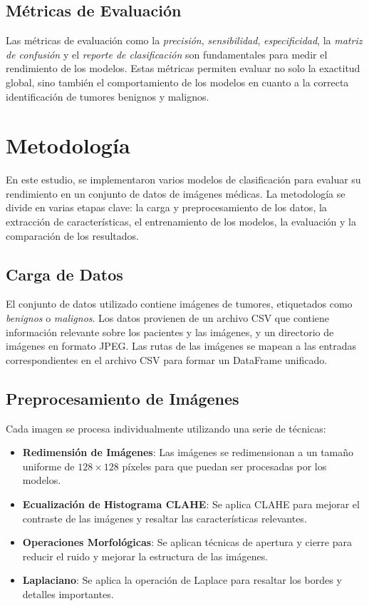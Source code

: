 \documentclass[12pt]{article}
\begin{document}
\subsection{Métricas de Evaluación}
Las métricas de evaluación como la \textit{precisión}, \textit{sensibilidad}, \textit{especificidad}, la \textit{matriz de confusión} y el \textit{reporte de clasificación} son fundamentales para medir el rendimiento de los modelos. Estas métricas permiten evaluar no solo la exactitud global, sino también el comportamiento de los modelos en cuanto a la correcta identificación de tumores benignos y malignos.

\section{Metodología}
En este estudio, se implementaron varios modelos de clasificación para evaluar su rendimiento en un conjunto de datos de imágenes médicas. La metodología se divide en varias etapas clave: la carga y preprocesamiento de los datos, la extracción de características, el entrenamiento de los modelos, la evaluación y la comparación de los resultados.

\subsection{Carga de Datos}
El conjunto de datos utilizado contiene imágenes de tumores, etiquetados como \textit{benignos} o \textit{malignos}. Los datos provienen de un archivo CSV que contiene información relevante sobre los pacientes y las imágenes, y un directorio de imágenes en formato JPEG. Las rutas de las imágenes se mapean a las entradas correspondientes en el archivo CSV para formar un DataFrame unificado.

\subsection{Preprocesamiento de Imágenes}
Cada imagen se procesa individualmente utilizando una serie de técnicas:
\begin{itemize}
    \item \textbf{Redimensión de Imágenes}: Las imágenes se redimensionan a un tamaño uniforme de $128 \times 128$ píxeles para que puedan ser procesadas por los modelos.
    \item \textbf{Ecualización de Histograma CLAHE}: Se aplica CLAHE para mejorar el contraste de las imágenes y resaltar las características relevantes.
    \item \textbf{Operaciones Morfológicas}: Se aplican técnicas de apertura y cierre para reducir el ruido y mejorar la estructura de las imágenes.
    \item \textbf{Laplaciano}: Se aplica la operación de Laplace para resaltar los bordes y detalles importantes.
\end{itemize}
\end{document}
